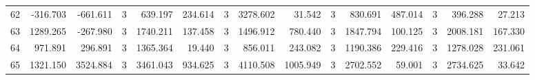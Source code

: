 \begin{table}[ht]
\begin{tabular}{lrrrrrrrrrrrrrr}
62 & -316.703 & -661.611 & 3 & 639.197 & 234.614 & 3 & 3278.602 & 31.542 & 3 & 830.691 & 487.014 & 3 & 396.288 & 27.213 \\
63 & 1289.265 & -267.980 & 3 & 1740.211 & 137.458 & 3 & 1496.912 & 780.440 & 3 & 1847.794 & 100.125 & 3 & 2008.181 & 167.330 \\
64 & 971.891 & 296.891 & 3 & 1365.364 & 19.440 & 3 & 856.011 & 243.082 & 3 & 1190.386 & 229.416 & 3 & 1278.028 & 231.061 \\
65 & 1321.150 & 3524.884 & 3 & 3461.043 & 934.625 & 3 & 4110.508 & 1005.949 & 3 & 2702.552 & 59.001 & 3 & 2734.625 & 33.642 \\
\hline
\end{tabular}
\end{table}
